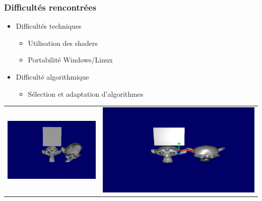 \documentclass{beamer}
\begin{document}
\begin{frame}
\frametitle{Difficultés rencontrées}
\begin{itemize}[label=$\bullet$]
\item Difficultés techniques
\begin{itemize}[label=$\circ$]
\item Utilisation des shaders
\item Portabilité Windows/Linux
\end{itemize}
\item Difficulté algorithmique %
\begin{itemize}[label=$\circ$]
\item Sélection et adaptation d'algorithmes
\end{itemize}
\end{itemize}
\begin{tabular}{l|r}
\includegraphics[scale=0.315]{rendu_sans_shader.png}
&
\includegraphics[scale=0.20]{singe_shaders.png}
\end{tabular}
\end{frame}
\end{document}
